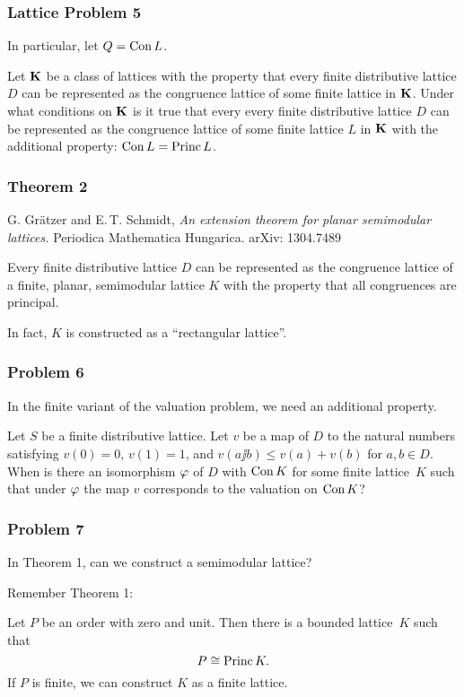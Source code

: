 \documentclass[leqno]{beamer}
\DeclareMathOperator{\Princ}{Princ}
\begin{document}
\begin{frame}
\frametitle{Lattice Problem 5}
In particular, let $Q = \operatorname{Con} L$.

\begin{problem}
Let $\bold K$ be a class of lattices
with the property that every finite distributive lattice $D$
can be represented 
as the congruence lattice of some finite lattice in $\bold K$. 
Under what conditions on $\bold K$ is it true that every 
every finite distributive lattice $D$
can be represented 
as the congruence lattice of some finite lattice $L$ in $\bold K$
with the additional property: $\Con L = \Princ L$.
\end{problem}
\end{frame}

\begin{frame}
\frametitle{Theorem 2}

G. Gr\"atzer and E.\,T. Schmidt, 
\emph{An extension theorem for planar semimodular lattices.}
Periodica Mathematica Hungarica.
arXiv: 1304.7489

\begin{theorem}
Every finite distributive lattice $D$
can be represented as the congruence lattice of 
a finite, planar, semimodular lattice $K$ with the property that
all congruences are principal.
\end{theorem}

In fact, $K$ is constructed as a ``rectangular lattice''.
\end{frame}

\begin{frame}
\frametitle{Problem 6}
In the finite variant of the valuation problem,
we need an additional property.

\begin{problem}
Let $S$ be a finite distributive lattice. 
Let $v$ be a map of $D$ to the natural numbers
satisfying $v(0) = 0$, $v(1) = 1$, and 
$v(a \jj b) \leq v(a) + v(b)$ for $a, b \in D$.
When is there an isomorphism $\gf$
of $D$ with $\operatorname{Con} K$ for some finite lattice~$K$
such that under $\gf$ the map $v$ corresponds 
to the valuation on $\operatorname{Con} K$?
\end{problem}
\end{frame}

\begin{frame}
\frametitle{Problem 7}

\begin{problem}
In Theorem 1, can we construct a semimodular lattice?
\end{problem}

\pause

Remember Theorem 1:

\begin{theorem}
Let $P$ be an order with zero and unit.
Then there is a bounded lattice~$K$ such that
\[
   P \iso \Princ K.
\]
If $P$ is finite, we can construct $K$ as a finite lattice.
\end{theorem}
\end{frame}
\end{document}
